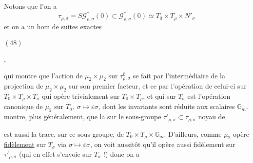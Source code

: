 
Notons que l'on a
\[
\tau_{\rho,\sigma}=S\mathcal G^*_{\rho,\sigma}(0)\subset\mathcal G^*_{\rho,\sigma}(0)\simeq T_0\times T_\rho\times N'_\sigma
\]
et on a un hom de suites exactes

\begin{samepage}
\noindent$(48)$\quad
{}
\end{samepage},

qui montre que l'action de $\mu_2\times\mu_2$ sur \deleted{$\unsure{\tau}$} $\tau^0_{\rho,\sigma}$ se fait par l'intermédiaire de la projection de $\mu_2\times\mu_2$ sur son premier facteur, et ce par l'opération de celui-ci sur $T_0\times T_\rho\times T_\sigma$ qui opère trivialement sur $T_0\times T_\rho$, et qui sur $T_\sigma$ est l'opération canonique de $\mu_2$ sur $T_\sigma$, $\sigma\mapsto\varepsilon\sigma$, dont les invariants sont réduits aux scalaires $\mathbb G_m$.   montre, plus généralement, que la   sur le sous-groupe $\tau'_{\rho,\sigma}\subset\tau_{\rho,\sigma}$ noyau de


est aussi la trace, sur ce sous-groupe, de $T_0\times T_\rho\times\mathbb G_m$. D'ailleurs, comme $\mu_2$ opère \uline{fidèlement} sur $T_\sigma$ via $\sigma\mapsto\varepsilon\sigma$, on voit  aussitôt qu'il opère aussi fidèlement sur $\tau'_{\rho,\sigma}$ (qui en effet s'envoie \uline{} sur $T_\sigma$ !) donc on a

